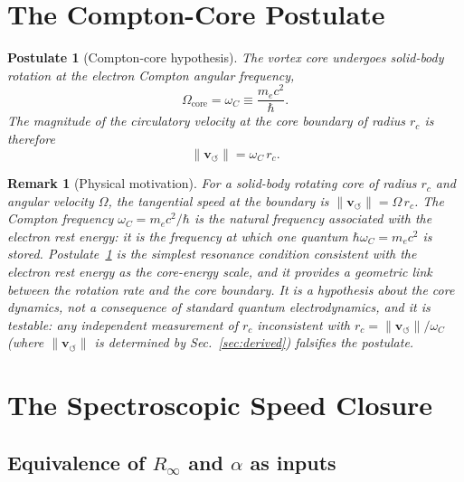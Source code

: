 \documentclass[aps,pra,preprint,longbibliography,nofootinbib]{revtex4-2}
\newtheorem{postulate}{Postulate}
\newtheorem{remark}{Remark}
\newcommand{\vnorm}{\lVert\mathbf{v}_{\!\boldsymbol{\circlearrowleft}}\rVert} %
\newcommand{\rc}{r_c}                            %
\newcommand{\omC}{\omega_C}                      %
\begin{document}
\section{The Compton-Core Postulate}
\label{sec:postulate}

\begin{postulate}[Compton-core hypothesis]
\label{post:compton}
The vortex core undergoes solid-body rotation at the electron
Compton angular frequency,
\begin{equation}
  \Omega_{\mathrm{core}} = \omC \equiv \frac{m_e c^2}{\hbar}.
  \label{eq:postulate}
\end{equation}
The magnitude of the circulatory velocity at the core boundary
of radius $\rc$ is therefore
\begin{equation}
  \vnorm = \omC\,\rc.
  \label{eq:vc_rc_link}
\end{equation}
\end{postulate}

\begin{remark}[Physical motivation]
\label{rem:motivation}
For a solid-body rotating core of radius $\rc$ and angular
velocity $\Omega$, the tangential speed at the boundary is
$\vnorm = \Omega\,\rc$.
The Compton frequency $\omC = m_e c^2/\hbar$ is the natural
frequency associated with the electron rest energy: it is the
frequency at which one quantum $\hbar\omC = m_e c^2$ is stored.
Postulate~\ref{post:compton} is the simplest resonance condition
consistent with the electron rest energy as the core-energy scale,
and it provides a geometric link between the rotation rate and the
core boundary.
It is a hypothesis about the core dynamics, not a consequence of
standard quantum electrodynamics, and it is testable: any
independent measurement of $\rc$ inconsistent with
$\rc = \vnorm/\omC$ (where $\vnorm$ is determined by
Sec.~\ref{sec:derived}) falsifies the postulate.
\end{remark}

\section{The Spectroscopic Speed Closure}
\label{sec:rydberg}

\subsection{Equivalence of $R_\infty$ and $\alpha$ as inputs}
\end{document}
